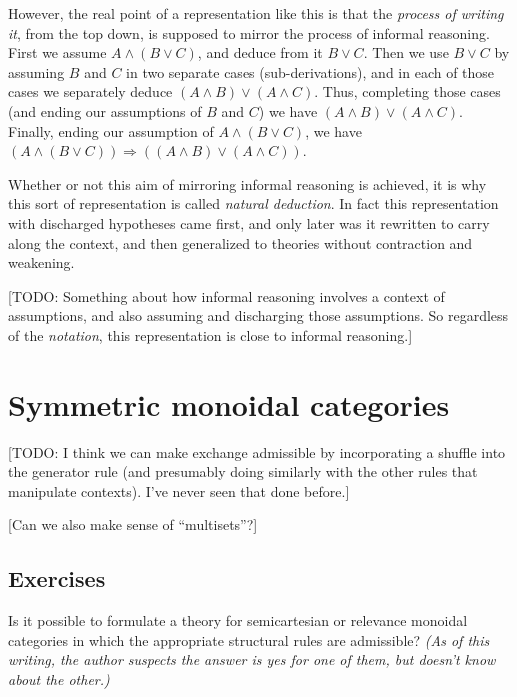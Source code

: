 \documentclass{book}
\let\meet\wedge
\let\join\vee
\let\To\Rightarrow
\begin{document}
However, the real point of a representation like this is that the \emph{process of writing it}, from the top down, is supposed to mirror the process of informal reasoning.
First we assume $A\meet (B\join C)$, and deduce from it $B\join C$.
Then we use $B\join C$ by assuming $B$ and $C$ in two separate cases (sub-derivations), and in each of those cases we separately deduce ${(A\meet B)\join (A\meet C)}$.
Thus, completing those cases (and ending our assumptions of $B$ and $C$) we have $(A\meet B)\join (A\meet C)$.
Finally, ending our assumption of $A\meet (B\join C)$, we have $(A\meet (B\join C))\To ((A\meet B)\join (A\meet C))$.

Whether or not this aim of mirroring informal reasoning is achieved, it is why this sort of representation is called \emph{natural deduction}.
In fact this representation with discharged hypotheses came first, and only later was it rewritten to carry along the context, and then generalized to theories without contraction and weakening.

[TODO: Something about how informal reasoning involves a context of assumptions, and also assuming and discharging those assumptions.
So regardless of the \emph{notation}, this representation is close to informal reasoning.]


\section{Symmetric monoidal categories}
\label{sec:symmoncat}

[TODO: I think we can make exchange admissible by incorporating a shuffle into the generator rule (and presumably doing similarly with the other rules that manipulate contexts).
I've never seen that done before.]

[Can we also make sense of ``multisets''?]

\subsection*{Exercises}

\begin{ex}\label{ex:semicart-relevance-strucadm}
  Is it possible to formulate a theory for semicartesian or relevance monoidal categories in which the appropriate structural rules are admissible?
  \textit{(As of this writing, the author suspects the answer is yes for one of them, but doesn't know about the other.)}
\end{ex}
\end{document}
